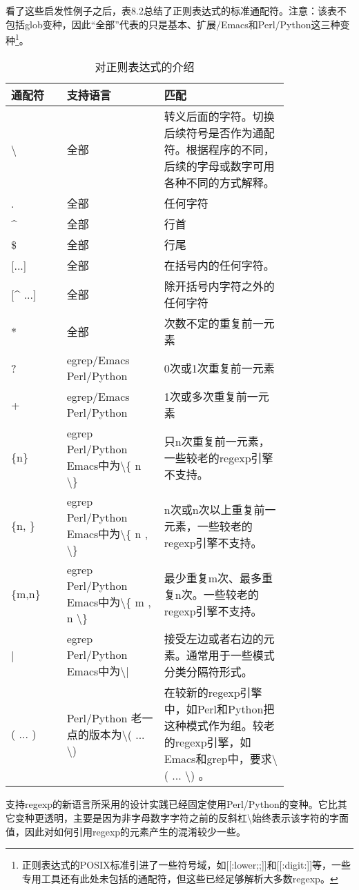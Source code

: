 \documentclass[12pt,oneside]{book}
\begin{document}
\begin{common-format}
看了这些启发性例子之后，表8.2总结了正则表达式的标准通配符。注意：该表不包括glob变种，因此“全部”代表的只是基本、扩展/Emacs和Perl/Python这三种变种\footnote{正则表达式的POSIX标准引进了一些符号域，如[[:lower;;]]和[[:digit:]]等，一些专用工具还有此处未包括的通配符，但这些已经足够解析大多数regexp。}。


\begin{table}[H]
\centering
\caption{对正则表达式的介绍}
\medskip 
\begin{tabular}{@{}lp{0.35\linewidth}p{0.45\linewidth}@{}}
\toprule
通配符 & 支持语言 & 匹配  \\ \midrule
\textbackslash  & 全部 & 转义后面的字符。切换后续符号是否作为通配符。根据程序的不同，后续的字母或数字可用各种不同的方式解释。  \\
.  & 全部 & 任何字符 \\
\^{} & 全部 & 行首 \\
\${}  & 全部 &  行尾 \\{}
[...]  & 全部 & 在括号内的任何字符。\\{}
[\^{} ...] & 全部 & 除开括号内字符之外的任何字符\\
* & 全部 & 次数不定的重复前一元素 \\
? & egrep/Emacs  Perl/Python & 0次或1次重复前一元素 \\
+ &  egrep/Emacs  Perl/Python & 1次或多次重复前一元素  \\
\{n\} & egrep  Perl/Python Emacs中为\textbackslash{}\{ n  \textbackslash  \}  & 只n次重复前一元素，一些较老的regexp引擎不支持。\\
\{n, \} & egrep  Perl/Python  Emacs中为\textbackslash{}\{ n , \textbackslash  \}  & n次或n次以上重复前一元素，一些较老的regexp引擎不支持。 \\
\{m,n\} & egrep  Perl/Python Emacs中为\textbackslash{}\{ m , n \textbackslash  \}  & 最少重复m次、最多重复n次。一些较老的regexp引擎不支持。 \\
| &  egrep  Perl/Python Emacs中为\textbackslash{}|  & 接受左边或者右边的元素。通常用于一些模式分类分隔符形式。\\
( ... ) &  Perl/Python  老一点的版本为\textbackslash ( ... \textbackslash )  &  在较新的regexp引擎中，如Perl和Python把这种模式作为组。较老的regexp引擎，如Emacs和grep中，要求\textbackslash ( ... \textbackslash ) 。
 \\ \bottomrule
\end{tabular}
\end{table}

支持regexp的新语言所采用的设计实践已经固定使用Perl/Python的变种。它比其它变种更透明，主要是因为非字母数字字符之前的反斜杠\textbackslash 始终表示该字符的字面值，因此对如何引用regexp的元素产生的混淆较少一些。


\end{common-format}
\end{document}
